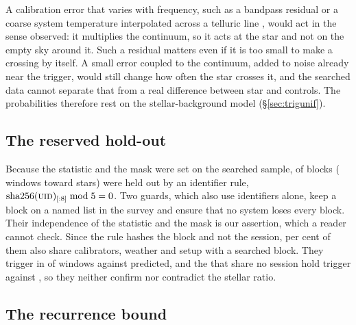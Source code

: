 A calibration error that varies with frequency, such as a bandpass residual
or a coarse system temperature interpolated across a telluric line
\citep{ALMATsys2018}, would act in the sense observed: it multiplies the
continuum, so it acts at the star and not on the empty sky around it. Such
a residual matters even if it is too small to make a crossing by itself. A small
error coupled to the continuum, added to noise already near the trigger,
would still change how often the star crosses it, and the searched data
cannot separate that from a real difference between star and controls. The
probabilities therefore rest on the stellar-background model
(\S\ref{sec:trigunif}).

\subsection{The reserved hold-out}
\label{sec:heldout}

Because the statistic and the mask were set on the searched sample,
\NEbHeldOut{} of \NEbProcessedAll{} blocks (\HoWin{} windows toward
\HoStars{} stars) were held out by an identifier rule,
$\mathrm{sha256}(\textsc{uid})_{[:8]} \bmod 5 = 0$. Two guards, which also
use identifiers alone, keep a block on a named list in the survey and ensure
that no system loses every block. Their independence of the statistic and the mask
is our assertion, which a reader cannot check. Since the rule hashes the
block and not the session, \HsSharePct{} per cent of them also share
calibrators, weather and setup with a searched block. They trigger in \StHoObs{} of
\StHoNFine{} windows against \StHoExpFine{} predicted, and the
\HsIndBlocks{} that share no session hold \HsIndObsWord{} trigger
\HsIndObsNoun{} against \HsIndExp, so they neither confirm nor contradict
the stellar ratio.

\subsection{The recurrence bound}
\label{sec:nullscatter}

